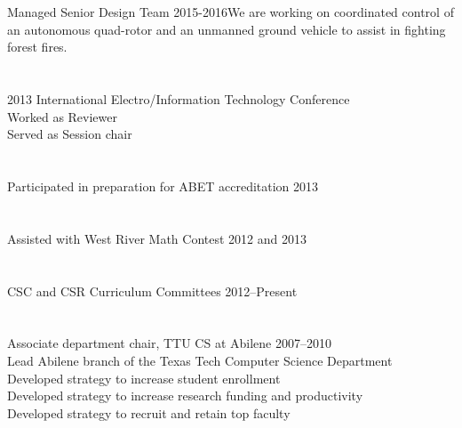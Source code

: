 \documentclass[12pt,letter]{resume}
\begin{document}
\section{}{Managed Senior Design Team 2015-2016}{We are working on
  coordinated control of an autonomous quad-rotor and an unmanned
  ground vehicle to assist in fighting forest fires.}


\section{}{2013 International Electro/Information Technology
  Conference}
{\\
\hspace*{1em} Worked as Reviewer\\
\hspace*{1em} Served as Session chair\\
}

\vspace*{-1.25\baselineskip}
\section{}{Participated in preparation for ABET accreditation 2013}{}

\vspace*{-1.25\baselineskip}
\section{}{Assisted with West River Math Contest 2012 and 2013}{}

\vspace*{-1.25\baselineskip}
\section{}{CSC and CSR Curriculum Committees 2012--Present}{}

\vspace*{-1.25\baselineskip}
\section{}{Associate department chair, TTU CS at Abilene 2007--2010}
{\\
\hspace*{1em} Lead Abilene branch of the Texas Tech Computer Science Department\\
\hspace*{1em} Developed strategy to increase student enrollment\\
\hspace*{1em} Developed strategy to increase research funding and productivity\\
\hspace*{1em} Developed strategy to recruit and retain top faculty\\
}
\end{document}
